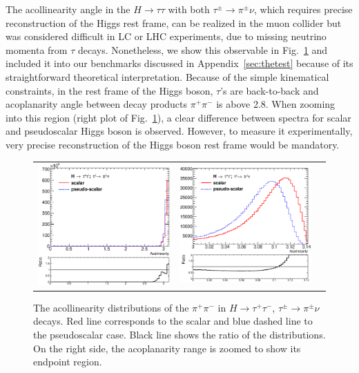 \documentclass[12pt]{article}
\begin{document}
The acollinearity angle in the $H \to \tau \tau$ with both  $\tau^\pm \to \pi^{\pm} \nu$, which requires 
precise reconstruction of the Higgs rest frame, can be realized  in the muon collider
 but  was considered difficult
in LC or LHC experiments, due to missing neutrino momenta from $\tau$ decays.
Nonetheless, we show this observable in Fig.~\ref{fig:acoll} and included it into our benchmarks discussed in 
Appendix~\ref{sec:thetest} because of its straightforward theoretical interpretation. 
Because of the simple kinematical constraints, in the rest frame of the Higgs boson, $\tau$'s are back-to-back 
and acoplanarity angle between decay products $\pi^+ \pi^-$ is above 2.8. 
When zooming into this region (right plot of Fig.~\ref{fig:acoll}), a clear difference between spectra
for scalar and pseudoscalar Higgs boson is observed. However, to measure it experimentally, very precise reconstruction
of the Higgs boson rest frame would be mandatory.

\begin{figure}[htp!]
\begin{tabular}{ccc}
  \includegraphics[width=0.48\columnwidth]{elta.eps} &
  \includegraphics[width=0.48\columnwidth]{elta2.eps} 
\end{tabular}
\caption{
The acollinearity distributions of the $\pi^+ \pi^-$ in $H \to \tau^+ \tau^- $, $\tau^\pm \to \pi^\pm \nu$ decays. 
Red line corresponds to the scalar and blue dashed line to the pseudoscalar case. 
Black line shows the ratio of the distributions.
On the right side, the acoplanarity range is zoomed 
to show  its endpoint region. 
\label{fig:acoll}}
\end{figure}
\end{document}
